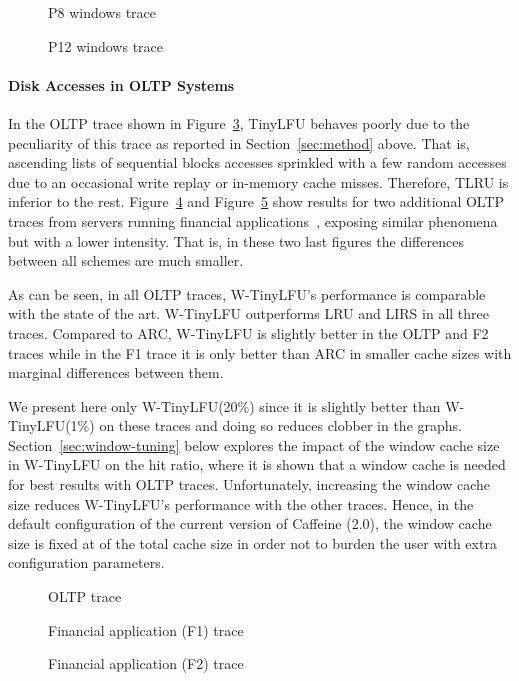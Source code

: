 \documentclass[10pt,a4paper]{article}
\begin{document}
\begin{figure}[t]
	\caption{P8 windows trace}
	\label{fig:P8}
\end{figure}
\begin{figure}[t]
	\caption{P12 windows trace}
	\label{fig:P12}
\end{figure}


\paragraph*{Disk Accesses in OLTP Systems}
In the OLTP trace shown in Figure~\ref{fig:oltp}, TinyLFU behaves poorly due to the peculiarity of this trace as reported in Section~\ref{sec:method} above.
That is, ascending lists of sequential blocks accesses sprinkled with a few random accesses due to an occasional write replay or in-memory cache misses.
Therefore, TLRU is inferior to the rest.
Figure~\ref{fig:F1} and Figure~\ref{fig:F2} show results for two additional OLTP traces from servers running financial applications~\cite{UMAS}, exposing similar phenomena but with a lower intensity.
That is, in these two last figures the differences between all schemes are much smaller.

As can be seen, in all OLTP traces, W-TinyLFU's performance is comparable with the state of the art.
W-TinyLFU outperforms LRU and LIRS in all three traces.
Compared to ARC, W-TinyLFU is slightly better in the OLTP and F2 traces while in the F1 trace it is only better than ARC in smaller cache sizes with marginal differences between them.

We present here only W-TinyLFU(20\%) since it is slightly better than W-TinyLFU(1\%) on these traces and doing so reduces clobber in the graphs.
Section~\ref{sec:window-tuning} below explores the impact of the window cache size in W-TinyLFU on the hit ratio, where it is shown that a  window cache is needed for best results with OLTP traces.
Unfortunately, increasing the window cache size reduces W-TinyLFU's performance with the other traces.
Hence, in the default configuration of the current version of Caffeine (2.0), the window cache size is fixed at  of the total cache size in order not to burden the user with extra configuration parameters.

\begin{figure}[t]
	\caption{OLTP trace}
	\label{fig:oltp}
\end{figure}
\begin{figure}[t]
	\caption{Financial application (F1) trace}
	\label{fig:F1}
\end{figure}
\begin{figure}[t]
	\caption{Financial application (F2) trace}
	\label{fig:F2}
\end{figure}
\end{document}
